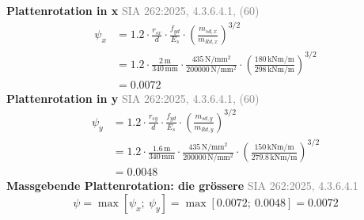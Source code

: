 \documentclass[11pt,a4paper]{article}
\newcommand{\normref}[1]{{\small\textcolor{gray}{#1}}}
\begin{document}
\noindent\textbf{Plattenrotation in x} \hfill \normref{SIA 262:2025, 4.3.6.4.1, (60)}
\begin{equation*}
\begin{aligned}
  \psi_x &= 1.2 \cdot \frac{r_{sx}}{d} \cdot \frac{f_{yd}}{E_s} \cdot \left(\frac{m_{sd,x}}{m_{Rd,x}}\right)^{3/2} \\
  &= 1.2 \cdot \frac{2\,\mathrm{m}}{340\,\mathrm{mm}} \cdot \frac{435\,\mathrm{N}/\mathrm{mm}^{2}}{200000\,\mathrm{N}/\mathrm{mm}^{2}} \cdot \left(\frac{180\,\mathrm{kNm}/\mathrm{m}}{298\,\mathrm{kNm}/\mathrm{m}}\right)^{3/2} \\
  &= 0.0072
\end{aligned}
\end{equation*}
\noindent\textbf{Plattenrotation in y} \hfill \normref{SIA 262:2025, 4.3.6.4.1, (60)}
\begin{equation*}
\begin{aligned}
  \psi_y &= 1.2 \cdot \frac{r_{sy}}{d} \cdot \frac{f_{yd}}{E_s} \cdot \left(\frac{m_{sd,y}}{m_{Rd,y}}\right)^{3/2} \\
  &= 1.2 \cdot \frac{1.6\,\mathrm{m}}{340\,\mathrm{mm}} \cdot \frac{435\,\mathrm{N}/\mathrm{mm}^{2}}{200000\,\mathrm{N}/\mathrm{mm}^{2}} \cdot \left(\frac{150\,\mathrm{kNm}/\mathrm{m}}{279.8\,\mathrm{kNm}/\mathrm{m}}\right)^{3/2} \\
  &= 0.0048
\end{aligned}
\end{equation*}
\noindent\textbf{Massgebende Plattenrotation: die grössere} \hfill \normref{SIA 262:2025, 4.3.6.4.1}
\begin{equation*}
\psi = \max\left[\psi_x;\ \psi_y\right] = \max\left[0.0072;\ 0.0048\right] = 0.0072
\end{equation*}
\end{document}
